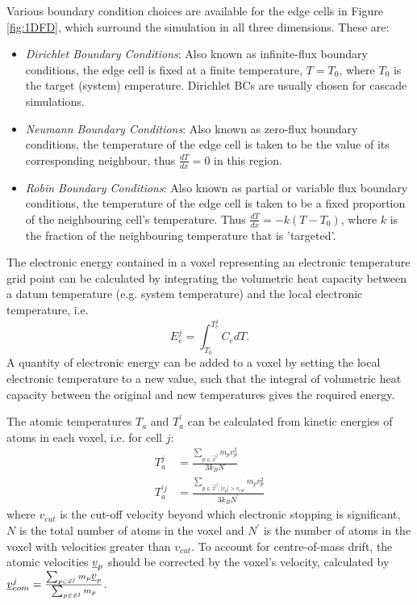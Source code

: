 Various boundary condition choices
are available for the edge cells in Figure \ref{fig:1DFD}, which surround the
simulation in all three dimensions. These are:
\begin{itemize}
	\item {\em Dirichlet Boundary Conditions}: Also known as
	infinite-flux boundary conditions, the edge cell is fixed at a
	finite temperature, $T = T_0$, where $T_0$ is the target
	(system) emperature. Dirichlet BCs are usually chosen for
	cascade simulations.

	\item {\em Neumann Boundary Conditions}: Also known as
	zero-flux boundary conditions, the temperature of the edge
	cell is taken to be the value of its corresponding neighbour,
	thus $\frac{dT}{dx} = 0$ in this region.

	\item {\em Robin Boundary Conditions}: Also known as
	partial or variable flux boundary conditions, the temperature
	of the edge cell is taken to be a fixed proportion of the
	neighbouring cell's temperature. Thus
	$\frac{dT}{dx} = -k (T-T_0)$, where $k$ is the fraction of
	the neighbouring temperature that is 'targeted'.
\end{itemize}

The electronic energy contained in a voxel representing an electronic
temperature grid point can be calculated by integrating the volumetric
heat capacity between a datum temperature (e.g. system temperature)
and the local electronic temperature, i.e.
\begin{equation}
E_{e}^{j} = \int_{T_{0}}^{T_{e}^{j}} C_{e} dT.
\end{equation}
A quantity of electronic energy can be added to a voxel by setting the
local electronic temperature to a new value, such that the integral of
volumetric heat capacity between the original and new temperatures
gives the required energy.

The atomic temperatures $T_a$ and $T_a^{\prime}$ can be calculated
from kinetic energies of atoms in each voxel, i.e. for cell $j$:
\begin{align}
T_{a}^{j}          &= \frac{\sum_{p \in \vec{x}^j} m_p v_p^2}{3 k_B N} \\
T_{a}^{\prime j} &= \frac{\sum_{p \in \vec{x}^j, |v_p | > v_{cut}} m_p v_p^2}{3 k_B N^{\prime}}
\end{align}
where $v_{cut}$ is the cut-off velocity beyond which electronic stopping
is significant, $N$ is the total number of atoms in the voxel and $N^{\prime}$
is the number of atoms in the voxel with velocities greater than $v_{cut}$.
To account for centre-of-mass drift, the atomic velocities $\mbox{$\underline{v}$}_p$
should be corrected by the voxel's velocity, calculated by
$\mbox{$\underline{v}$}^j_{com} = \frac{\sum_{p \in \vec{x}^j} m_p \mbox{$\underline{v}$}_p}{\sum_{p \in \vec{x}^j} m_p}$.

